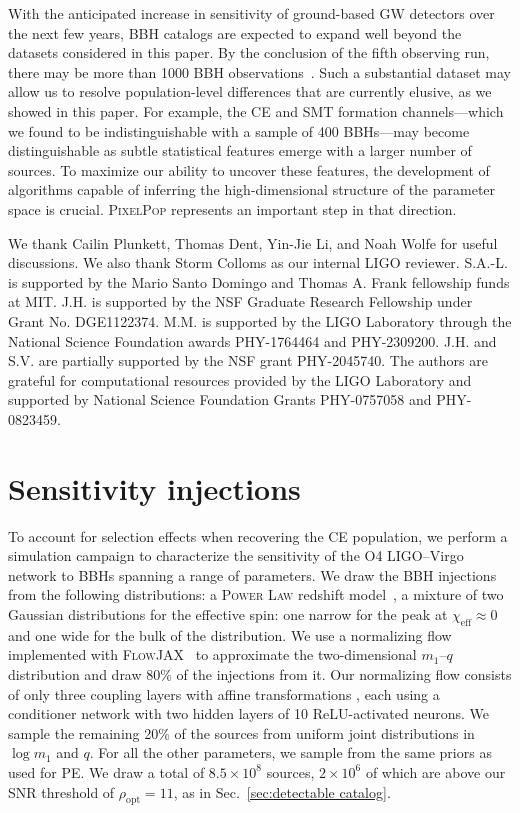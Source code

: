 \documentclass[twocolumn, twocolappendix]{aastex631}
\newcommand{\chieff}{\ensuremath{\chi_\mathrm{eff}}}
\newcommand{\PixelPop}{\textsc{PixelPop}\xspace}
\begin{document}
With the anticipated increase in sensitivity of ground-based \ac{GW} detectors over the next few years, \ac{BBH} catalogs are expected to expand well beyond the datasets considered in this paper. By the conclusion of the fifth observing run, there may be more than 1000 \ac{BBH} observations~\citep{Kiendrebeogo:2023hzf}. Such a substantial dataset may allow us to resolve population-level differences that are currently elusive, as we showed in this paper. For example, the \ac{CE} and \ac{SMT} formation channels---which we found to be indistinguishable with a sample of 400 \acp{BBH}---may become distinguishable as subtle statistical features emerge with a larger number of sources. To maximize our ability to uncover these features, the development of algorithms capable of inferring the high-dimensional structure of the parameter space is crucial. \PixelPop represents an important step in that direction.

\begin{acknowledgments}
We thank Cailin Plunkett, Thomas Dent, Yin-Jie Li, and Noah Wolfe for useful discussions. We also thank Storm Colloms as our internal LIGO reviewer.
%
S.A.-L. is supported by the Mario Santo Domingo and Thomas A. Frank fellowship funds at MIT.
%
J.H. is supported by the NSF Graduate Research Fellowship under Grant No. DGE1122374.
%
M.M. is supported by the LIGO Laboratory through the National Science Foundation awards PHY-1764464 and PHY-2309200.
%
J.H. and S.V. are partially supported by the NSF grant PHY-2045740.
%
The authors are grateful for computational resources provided by the LIGO Laboratory and supported by National Science Foundation Grants PHY-0757058 and PHY-0823459.
\end{acknowledgments}


\appendix
\section{Sensitivity injections}\label{app:vtInjs}

To account for selection effects when recovering the \ac{CE} population, we perform a simulation campaign to characterize the sensitivity of the O4 LIGO--Virgo network to \acp{BBH} spanning a range of parameters. We draw the \ac{BBH} injections from the following distributions: a \textsc{Power Law} redshift model~\citep{Fishbach:2018edt}, a mixture of two Gaussian distributions for the effective spin: one narrow for the peak at $\chieff\approx0$ and one wide for the bulk of the distribution. We use a normalizing flow~\citep{Papamakarios:2019fms, Kobyzev:2019ydm} implemented with \textsc{FlowJAX}~\citep{ward2023flowjax} to approximate the two-dimensional $m_1$--$q$ distribution and draw 80\% of the injections from it. Our normalizing flow consists of only three coupling layers with affine transformations \citep{dinh2016density}, each using a conditioner network with two hidden layers of 10 ReLU-activated neurons. We sample the remaining 20\% of the sources from uniform joint distributions in $\log{m_1}$ and $q$. For all the other parameters, we sample from the same priors as used for \ac{PE}. We draw a total of $8.5 \times 10^8$ sources, $2 \times 10^6$ of which are above our SNR threshold of $\rho_\mathrm{opt}=11$, as in Sec.~\ref{sec:detectable catalog}.
\end{document}
